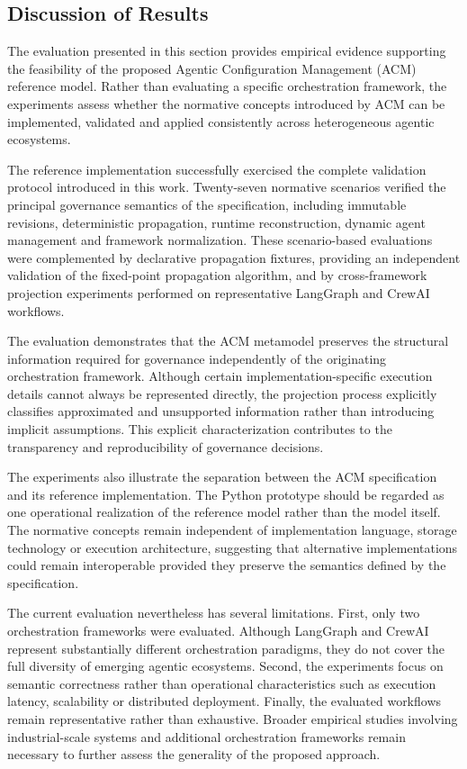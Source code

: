 \documentclass[10pt]{article}
\begin{document}
\subsection{Discussion of Results}
\label{sec:discussion_results}

The evaluation presented in this section provides empirical evidence supporting the feasibility of the proposed Agentic Configuration Management (ACM) reference model. Rather than evaluating a specific orchestration framework, the experiments assess whether the normative concepts introduced by ACM can be implemented, validated and applied consistently across heterogeneous agentic ecosystems.

The reference implementation successfully exercised the complete validation protocol introduced in this work. Twenty-seven normative scenarios verified the principal governance semantics of the specification, including immutable revisions, deterministic propagation, runtime reconstruction, dynamic agent management and framework normalization. These scenario-based evaluations were complemented by declarative propagation fixtures, providing an independent validation of the fixed-point propagation algorithm, and by cross-framework projection experiments performed on representative LangGraph and CrewAI workflows.

The evaluation demonstrates that the ACM metamodel preserves the structural information required for governance independently of the originating orchestration framework. Although certain implementation-specific execution details cannot always be represented directly, the projection process explicitly classifies approximated and unsupported information rather than introducing implicit assumptions. This explicit characterization contributes to the transparency and reproducibility of governance decisions.

The experiments also illustrate the separation between the ACM specification and its reference implementation. The Python prototype should be regarded as one operational realization of the reference model rather than the model itself. The normative concepts remain independent of implementation language, storage technology or execution architecture, suggesting that alternative implementations could remain interoperable provided they preserve the semantics defined by the specification.

The current evaluation nevertheless has several limitations. First, only two orchestration frameworks were evaluated. Although LangGraph and CrewAI represent substantially different orchestration paradigms, they do not cover the full diversity of emerging agentic ecosystems. Second, the experiments focus on semantic correctness rather than operational characteristics such as execution latency, scalability or distributed deployment. Finally, the evaluated workflows remain representative rather than exhaustive. Broader empirical studies involving industrial-scale systems and additional orchestration frameworks remain necessary to further assess the generality of the proposed approach.
\end{document}
